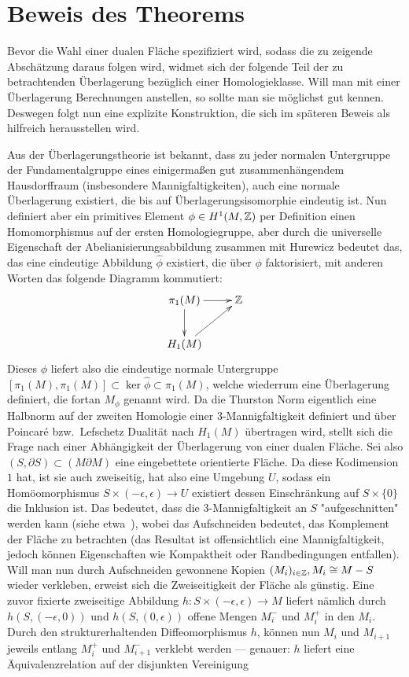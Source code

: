 \section{Beweis des Theorems}

Bevor die Wahl einer dualen Fläche spezifiziert wird, sodass die zu zeigende Abschätzung daraus folgen wird, widmet sich der folgende Teil der zu betrachtenden Überlagerung bezüglich einer Homologieklasse. Will man mit einer Überlagerung Berechnungen anstellen, so sollte man sie möglichst gut kennen. Deswegen folgt nun eine explizite Konstruktion, die sich im späteren Beweis als hilfreich herausstellen wird.

\begin{bem}
	\label{constr:cut}
	Aus der Überlagerungstheorie ist bekannt, dass zu jeder normalen Untergruppe der Fundamentalgruppe eines einigermaßen gut zusammenhängendem Hausdorffraum (insbesondere Mannigfaltigkeiten), auch eine normale Überlagerung existiert, die bis auf Überlagerungsisomorphie eindeutig ist. Nun definiert aber ein primitives Element $\phi\in H^1(M,\mathbb{Z})$ per Definition einen Homomorphismus auf der ersten Homologiegruppe, aber durch die universelle Eigenschaft der Abelianisierungsabbildung zusammen mit Hurewicz bedeutet das, das eine eindeutige Abbildung $\hat \phi$ existiert, die über $\phi$ faktorisiert, mit anderen Worten das folgende Diagramm kommutiert:
	\[
		\begin{xy}
			\xymatrix{\pi_1(M)\ar[r] \ar[d] & \ZZ \\
						H_1(M)\ar[ru]}
		\end{xy}
	\]
	Dieses $\phi$ liefert also die eindeutige normale Untergruppe $[\pi_1(M),\pi_1(M)]\subset\ker\hat\phi \subset \pi_1(M)$, welche wiederrum eine Überlagerung definiert, die fortan $M_\phi$ genannt wird. Da die Thurston Norm eigentlich eine Halbnorm auf der zweiten Homologie einer 3-Mannigfaltigkeit definiert und über Poincaré bzw.~Lefschetz Dualität nach $H_1(M)$ übertragen wird, stellt sich die Frage nach einer Abhängigkeit der Überlagerung von einer dualen Fläche. Sei also $(S,\partial S) \subset (M\partial M)$ eine eingebettete orientierte Fläche. Da diese Kodimension $1$ hat, ist sie auch zweiseitig, hat also eine Umgebung $U$, sodass ein Homöomorphismus $S\times (-\epsilon,\epsilon) \to U$ existiert dessen Einschränkung auf $S\times \{0\}$ die Inklusion ist. Das bedeutet, dass die 3-Mannigfaltigkeit an $S$ "aufgeschnitten" werden kann (siehe etwa~\cite{Burde2003}), wobei das Aufschneiden bedeutet, das Komplement der Fläche zu betrachten (das Resultat ist offensichtlich eine Mannigfaltigkeit, jedoch können Eigenschaften wie Kompaktheit oder Randbedingungen entfallen). Will man nun durch Aufschneiden gewonnene Kopien $(M_i)_{i\in \mathbb{Z}}, M_i \cong M-S$ wieder verkleben, erweist sich die Zweiseitigkeit der Fläche als günstig. Eine zuvor fixierte zweiseitige Abbildung $h: S\times (-\epsilon,\epsilon) \to M$ liefert nämlich durch $h(S,(-\epsilon,0))$ und $h(S,(0,\epsilon))$ offene Mengen $M_i^-$ und $M_i^+$ in den $M_i$. Durch den strukturerhaltenden Diffeomorphismus $h$, können nun $M_i$ und $M_{i+1}$ jeweils entlang $M_i^+$ und $M_{i+1}^-$ verklebt werden --- genauer: $h$ liefert eine Äquivalenzrelation auf der disjunkten Vereinigung 

\end{bem}

